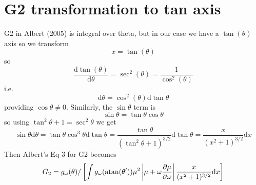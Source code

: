 \documentclass[]{article}
\begin{document}
\section{G2 transformation to tan axis}
G2 in Albert (2005) is integral over theta, but in our case we have a $\tan(\theta)$ axis so we transform 
\begin{equation}
x = \tan(\theta)
\end{equation}
so
\begin{equation}
\frac{\mathrm{d} \tan(\theta)}{\mathrm{d} \theta} = \sec^2(\theta) = \frac{1}{\cos^2(\theta)}
\end{equation}
i.e.
\begin{equation}
\mathrm{d} \theta = \cos^2(\theta) \mathrm{d}\tan\theta
\end{equation}
providing $\cos\theta \ne 0$. Similarly, the $\sin\theta$ term is 
\begin{equation}
\sin\theta = \tan \theta \cos\theta 
\end{equation}
so using $ \tan^2\theta + 1 = \sec^2\theta$ we get
\begin{equation}\label{TanTransform}
\sin\theta \mathrm{d}\theta = \tan\theta \cos^3\theta \mathrm{d}\tan\theta= \frac{\tan\theta}{(\tan^2 \theta + 1)^{3/2}}\mathrm{d}\tan\theta = \frac{x}{(x^2+1)^{3/2}} \mathrm{d}x
\end{equation}
Then Albert's Eq 3 for G2 becomes
\begin{equation}
G_2 = g_\omega(\theta)/\left[\int g_\omega(\mathrm{atan}(\theta^\prime)) \mu^2 \left| \mu + \omega \frac{\partial \mu}{\partial\omega} \right| \frac{x}{(x^2+1)^{3/2}} \mathrm{d}x\right]
\end{equation}
\end{document}
